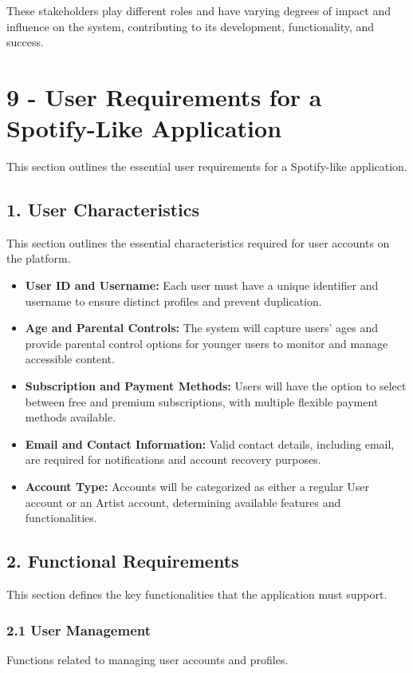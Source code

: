 \documentclass[a4paper,10pt]{article}
\begin{document}
These stakeholders play different roles and have varying degrees of impact and influence on the system, contributing to its development, functionality, and success.

\section*{9 - User Requirements for a Spotify-Like Application}
This section outlines the essential user requirements for a Spotify-like application.

\subsection*{1. User Characteristics}
This section outlines the essential characteristics required for user accounts on the platform.

\begin{itemize}[leftmargin=*]
    \item \textbf{User ID and Username:} Each user must have a unique identifier and username to ensure distinct profiles and prevent duplication.
    \item \textbf{Age and Parental Controls:} The system will capture users’ ages and provide parental control options for younger users to monitor and manage accessible content.
    \item \textbf{Subscription and Payment Methods:} Users will have the option to select between free and premium subscriptions, with multiple flexible payment methods available.
    \item \textbf{Email and Contact Information:} Valid contact details, including email, are required for notifications and account recovery purposes.
    \item \textbf{Account Type:} Accounts will be categorized as either a regular User account or an Artist account, determining available features and functionalities.
\end{itemize}

\subsection*{2. Functional Requirements}
This section defines the key functionalities that the application must support.

\subsubsection*{2.1 User Management}
Functions related to managing user accounts and profiles.
\end{document}
